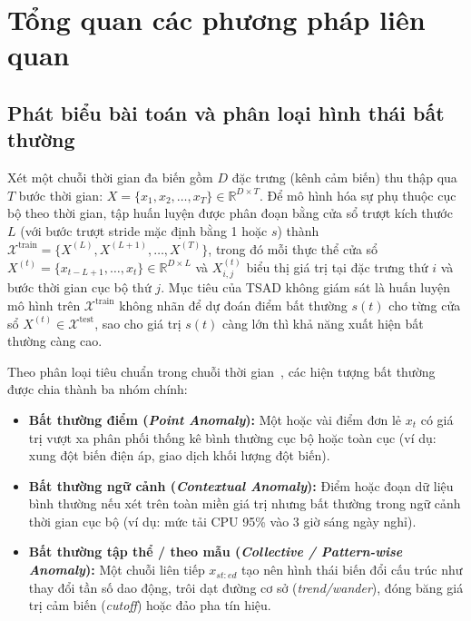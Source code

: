 \documentclass[sigconf,nonacm]{acmart}
\begin{document}
\section{Tổng quan các phương pháp liên quan}

\subsection{Phát biểu bài toán và phân loại hình thái bất thường}

Xét một chuỗi thời gian đa biến gồm $D$ đặc trưng (kênh cảm biến) thu thập qua $T$ bước thời gian: $X = \{x_1, x_2, \dots, x_T\} \in \mathbb{R}^{D \times T}$. Để mô hình hóa sự phụ thuộc cục bộ theo thời gian, tập huấn luyện được phân đoạn bằng cửa sổ trượt kích thước $L$ (với bước trượt stride mặc định bằng 1 hoặc $s$) thành $\mathcal{X}^{\text{train}} = \{X^{(L)}, X^{(L+1)}, \dots, X^{(T)}\}$, trong đó mỗi thực thể cửa sổ $X^{(t)} = \{x_{t-L+1}, \dots, x_t\} \in \mathbb{R}^{D \times L}$ và $X^{(t)}_{i,j}$ biểu thị giá trị tại đặc trưng thứ $i$ và bước thời gian cục bộ thứ $j$. Mục tiêu của TSAD không giám sát là huấn luyện mô hình trên $\mathcal{X}^{\text{train}}$ không nhãn để dự đoán điểm bất thường $s(t)$ cho từng cửa sổ $X^{(t)} \in \mathcal{X}^{\text{test}}$, sao cho giá trị $s(t)$ càng lớn thì khả năng xuất hiện bất thường càng cao.

Theo phân loại tiêu chuẩn trong chuỗi thời gian~\cite{blazquez2021, lai2021}, các hiện tượng bất thường được chia thành ba nhóm chính:
\begin{itemize}[leftmargin=*, itemsep=2pt, parsep=0pt]
    \item \textbf{Bất thường điểm (\textit{Point Anomaly}):} Một hoặc vài điểm đơn lẻ $x_t$ có giá trị vượt xa phân phối thống kê bình thường cục bộ hoặc toàn cục (ví dụ: xung đột biến điện áp, giao dịch khối lượng đột biến).
    \item \textbf{Bất thường ngữ cảnh (\textit{Contextual Anomaly}):} Điểm hoặc đoạn dữ liệu bình thường nếu xét trên toàn miền giá trị nhưng bất thường trong ngữ cảnh thời gian cục bộ (ví dụ: mức tải CPU 95\% vào 3 giờ sáng ngày nghỉ).
    \item \textbf{Bất thường tập thể / theo mẫu (\textit{Collective / Pattern-wise Anomaly}):} Một chuỗi liên tiếp $x_{st:ed}$ tạo nên hình thái biến đổi cấu trúc như thay đổi tần số dao động, trôi dạt đường cơ sở (\textit{trend/wander}), đóng băng giá trị cảm biến (\textit{cutoff}) hoặc đảo pha tín hiệu.
\end{itemize}
\end{document}

